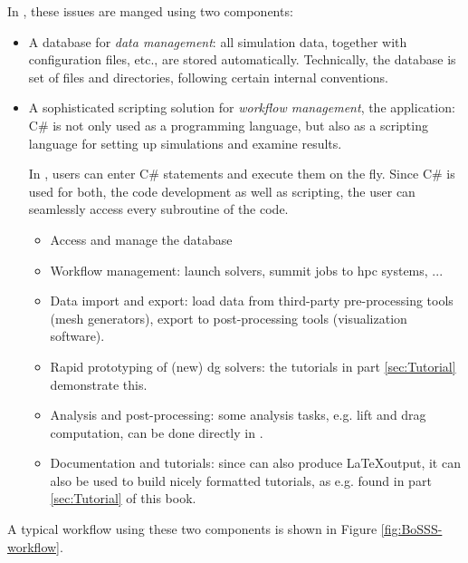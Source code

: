 \documentclass[a4paper,10pt]{report} %
\begin{document}
In \BoSSS{}, these issues are manged using two components:
\begin{itemize}
\item
A database for \emph{data management}:
all simulation data, together with configuration files, etc., are stored automatically.
Technically, the database is set of files and directories, following 
certain internal conventions.

\item
A sophisticated scripting solution for \emph{workflow management}, the \BoSSSpad{} application:
C\# is not only used as a programming language, but also as a scripting language
for setting up simulations and examine results.

In \BoSSSpad{}, users can enter C\# statements and execute them on the fly.
Since C\# is used for both, the code development as well as scripting,
the user can seamlessly access every subroutine of the code.

\begin{itemize}
\item
Access and manage the database

\item
Workflow management: launch solvers, summit jobs to hpc systems, ...

\item
Data import and export: load data from third-party pre-processing tools (mesh generators),
export to post-processing tools (visualization software).

\item
Rapid prototyping of (new) \ac{dg} solvers: the tutorials in part \ref{sec:Tutorial} demonstrate this.

\item
Analysis and post-processing: some analysis tasks, e.g. lift and drag computation,
can be done directly in \BoSSSpad{}.

\item
Documentation and tutorials: 
since \BoSSSpad{} can also produce \LaTeX output, it can also be used to 
build nicely formatted tutorials, as e.g. found in  part \ref{sec:Tutorial} of this book.

\end{itemize}
\end{itemize}
A typical workflow using these two components is shown in Figure \ref{fig:BoSSS-workflow}.
\end{document}
